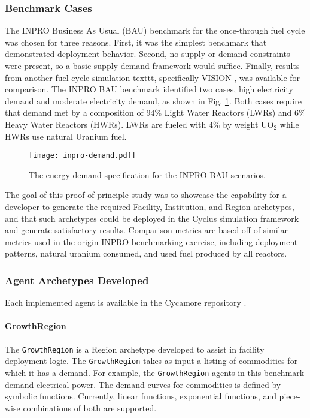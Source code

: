 \subsubsection{Benchmark Cases}

The INPRO Business As Usual (BAU) benchmark \cite{_international_2009} for the
once-through fuel cycle was chosen for three reasons. First, it was the simplest
benchmark that demonstrated deployment behavior. Second, no supply or demand
constraints were present, so a basic supply-demand framework would
suffice. Finally, results from another fuel cycle simulation texttt, specifically
VISION \cite{vision2009}, was available for comparison. The INPRO BAU benchmark
identified two cases, high electricity demand and moderate electricity demand,
as shown in Fig. \ref{fig:inpro-demand}. Both cases require that demand met by a
composition of 94\% Light Water Reactors (LWRs) and 6\% Heavy Water Reactors
(HWRs). LWRs are fueled with 4\% by weight UO$_2$ while HWRs use natural Uranium
fuel.

\begin{figure}
  \begin{center}
    \texttt{[image: inpro-demand.pdf]}
    \caption{The energy demand specification for the INPRO BAU scenarios.}
    \label{fig:inpro-demand}
  \end{center}  
\end{figure}

The goal of this proof-of-principle study was to showcase the capability for a
developer to generate the required Facility, Institution, and Region archetypes,
and that such archetypes could be deployed in the Cyclus simulation framework
and generate satisfactory results. Comparison metrics are based off of similar
metrics used in the origin INPRO benchmarking exercise, including deployment
patterns, natural uranium consumed, and used fuel produced by all reactors.

\subsubsection{Agent Archetypes Developed}

Each implemented agent is available in the Cycamore repository \cite{cycamore2013}.

\paragraph{GrowthRegion}

The \texttt{GrowthRegion} is a Region archetype developed to assist in
facility deployment logic. The \texttt{GrowthRegion} takes as input a listing of
commodities for which it has a demand. For example, the \texttt{GrowthRegion}
agents in this benchmark demand electrical power. The demand curves for
commodities is defined by symbolic functions. Currently, linear functions,
exponential functions, and piece-wise combinations of both are supported.

